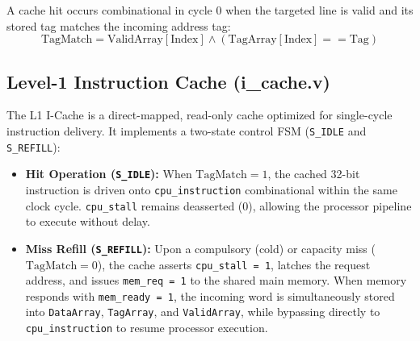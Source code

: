 \documentclass[conference]{IEEEtran}
\begin{document}
A cache hit occurs combinational in cycle 0 when the targeted line is valid and its stored tag matches the incoming address tag:
\begin{equation}
\text{TagMatch} = \text{ValidArray}[\text{Index}] \land (\text{TagArray}[\text{Index}] == \text{Tag})
\end{equation}

\subsection{Level-1 Instruction Cache (i\_cache.v)}
The L1 I-Cache is a direct-mapped, read-only cache optimized for single-cycle instruction delivery. It implements a two-state control FSM (\texttt{S\_IDLE} and \texttt{S\_REFILL}):
\begin{itemize}
    \item \textbf{Hit Operation (\texttt{S\_IDLE}):} When $\text{TagMatch} = 1$, the cached 32-bit instruction is driven onto \texttt{cpu\_instruction} combinational within the same clock cycle. \texttt{cpu\_stall} remains deasserted ($0$), allowing the processor pipeline to execute without delay.
    \item \textbf{Miss Refill (\texttt{S\_REFILL}):} Upon a compulsory (cold) or capacity miss ($\text{TagMatch} = 0$), the cache asserts \texttt{cpu\_stall = 1}, latches the request address, and issues \texttt{mem\_req = 1} to the shared main memory. When memory responds with \texttt{mem\_ready = 1}, the incoming word is simultaneously stored into \texttt{DataArray}, \texttt{TagArray}, and \texttt{ValidArray}, while bypassing directly to \texttt{cpu\_instruction} to resume processor execution.
\end{itemize}
\end{document}
